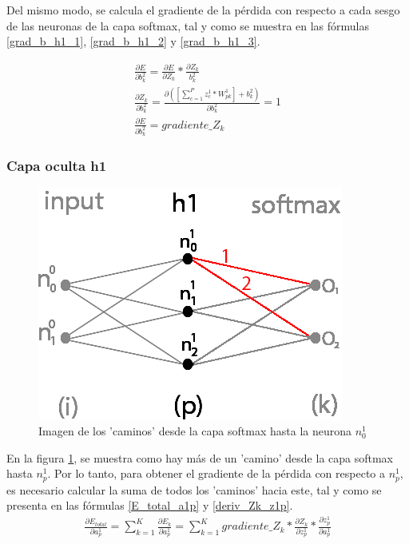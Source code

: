 Del mismo modo, se calcula el gradiente de la pérdida con respecto a cada sesgo de las neuronas de la capa softmax, tal y como se muestra en las fórmulas \ref{grad_b_h1_1}, \ref{grad_b_h1_2} y \ref{grad_b_h1_3}.

\begin{gather}
	\frac{\partial E}{\partial b^2_k} = \frac{\partial E}{\partial Z_k} * \frac{\partial Z_k}{b^2_k} \label{grad_b_h1_1} \\
	\frac{\partial Z_k }{\partial b^2_k } = \frac{\partial ([\sum_{c=1}^{P} z^1_c * W^1_{pk}] + b^2_k) }{\partial b^2_k } = 1 \label{grad_b_h1_2} \\
	\frac{\partial E}{\partial b^2_k} = gradiente\_Z_k \label{grad_b_h1_3}
\end{gather}

\subsubsection{Capa oculta h1}

\begin{figure}[H]
	\centering
	\includegraphics[scale=0.35]{imagenes/nn_caminos_posibles.jpg}  
	\caption{Imagen de los 'caminos' desde la capa softmax hasta la neurona $n^1_0$}
	\label{nn_caminos_posibles}
\end{figure}

En la figura \ref{nn_caminos_posibles}, se muestra como hay más de un 'camino' desde la capa softmax hasta $n^1_p$. Por lo tanto, para obtener el gradiente de la pérdida con respecto a $n^1_p$, es necesario calcular la suma de todos los 'caminos' hacia este, tal y como se presenta en las fórmulas \ref{E_total_a1p} y \ref{deriv_Zk_z1p}. \\

\begin{gather}
	\frac{\partial E_{total}}{\partial a^1_p} = \sum_{k=1}^K \frac{\partial E_k}{\partial a^1_p} = \sum_{k=1}^K  gradiente\_Z_k * \frac{\partial Z_k}{\partial z^1_p} * \frac{\partial z^1_p}{\partial a^1_p}
	\label{E_total_a1p}
\end{gather}

